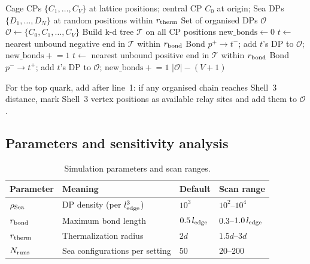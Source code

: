 \documentclass[11pt,letterpaper]{article}
\begin{document}
\begin{algorithm}[H]
\caption{Dipole Chain Formation}
\label{alg:chain}
\begin{algorithmic}[1]
\Require Cage CPs $\{C_1, \ldots, C_V\}$ at lattice positions;
  central CP $C_0$ at origin; Sea DPs $\{D_1, \ldots, D_N\}$
  at random positions within $r_{\rm therm}$
\Ensure Set of organised DPs $\mathcal{O}$
\State $\mathcal{O} \gets \{C_0, C_1, \ldots, C_V\}$
\State Build k-d tree $\mathcal{T}$ on all CP positions
\Repeat
  \State $\text{new\_bonds} \gets 0$
    \State $t \gets$ nearest unbound negative end in
      $\mathcal{T}$ within $r_{\rm bond}$
      \State Bond $p^+ \to t^-$; add $t$'s DP to $\mathcal{O}$;
        $\text{new\_bonds} \mathrel{+}= 1$
    \EndIf
  \EndFor
    \State $t \gets$ nearest unbound positive end in
      $\mathcal{T}$ within $r_{\rm bond}$
      \State Bond $p^- \to t^+$; add $t$'s DP to $\mathcal{O}$;
        $\text{new\_bonds} \mathrel{+}= 1$
    \EndIf
  \EndFor
{}
\State \Return $|\mathcal{O}| - (V + 1)$
\end{algorithmic}
\end{algorithm}

For the top quark, add after line~1: if any organised chain
reaches Shell~3 distance, mark Shell~3 vertex positions as
available relay sites and add them to $\mathcal{O}$.

\subsection{Parameters and sensitivity analysis}

\begin{table}[H]
\centering
\caption{Simulation parameters and scan ranges.}
\label{tab:params}
\begin{tabular}{@{}llll@{}}
\toprule
Parameter & Meaning & Default & Scan range \\
\midrule
$\rho_{\rm Sea}$ & DP density (per $l_{\rm edge}^3$)
  & $10^3$ & $10^2$--$10^4$ \\
$r_{\rm bond}$ & Maximum bond length
  & $0.5 \, l_{\rm edge}$ & $0.3$--$1.0 \, l_{\rm edge}$ \\
$r_{\rm therm}$ & Thermalization radius
  & $2d$ & $1.5d$--$3d$ \\
$N_{\rm runs}$ & Sea configurations per setting
  & 50 & 20--200 \\
\bottomrule
\end{tabular}
\end{table}
\end{document}
